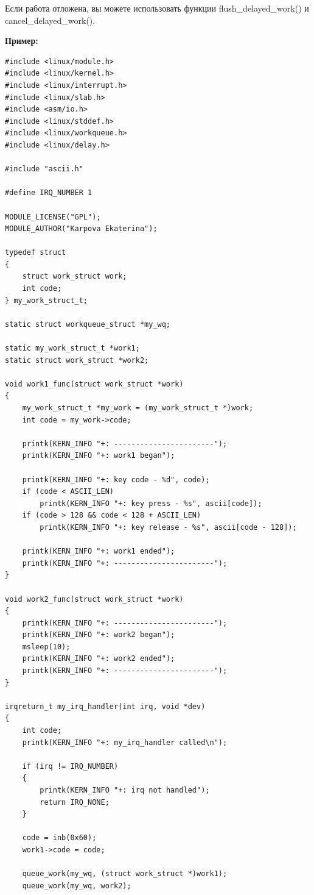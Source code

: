 Если работа отложена, вы можете использовать функции flush\_delayed\_work() и \\ cancel\_delayed\_work().

\textbf{Пример:}

\begin{lstlisting}
#include <linux/module.h>
#include <linux/kernel.h>
#include <linux/interrupt.h>
#include <linux/slab.h>
#include <asm/io.h>
#include <linux/stddef.h>
#include <linux/workqueue.h>
#include <linux/delay.h>

#include "ascii.h"

#define IRQ_NUMBER 1

MODULE_LICENSE("GPL");
MODULE_AUTHOR("Karpova Ekaterina");

typedef struct
{
    struct work_struct work;
    int code;
} my_work_struct_t;

static struct workqueue_struct *my_wq;

static my_work_struct_t *work1;
static struct work_struct *work2;

void work1_func(struct work_struct *work)
{
    my_work_struct_t *my_work = (my_work_struct_t *)work;
    int code = my_work->code;

    printk(KERN_INFO "+: -----------------------");
    printk(KERN_INFO "+: work1 began");

    printk(KERN_INFO "+: key code - %d", code);
    if (code < ASCII_LEN)
        printk(KERN_INFO "+: key press - %s", ascii[code]);
    if (code > 128 && code < 128 + ASCII_LEN)
        printk(KERN_INFO "+: key release - %s", ascii[code - 128]);

    printk(KERN_INFO "+: work1 ended");
    printk(KERN_INFO "+: -----------------------");
}

void work2_func(struct work_struct *work)
{
    printk(KERN_INFO "+: -----------------------");
    printk(KERN_INFO "+: work2 began");
    msleep(10);
    printk(KERN_INFO "+: work2 ended");
    printk(KERN_INFO "+: -----------------------");
}

irqreturn_t my_irq_handler(int irq, void *dev)
{
    int code;
    printk(KERN_INFO "+: my_irq_handler called\n");

    if (irq != IRQ_NUMBER)
    {
        printk(KERN_INFO "+: irq not handled");
        return IRQ_NONE;
    }

    code = inb(0x60);
    work1->code = code;

    queue_work(my_wq, (struct work_struct *)work1);
    queue_work(my_wq, work2);


\end{lstlisting}
